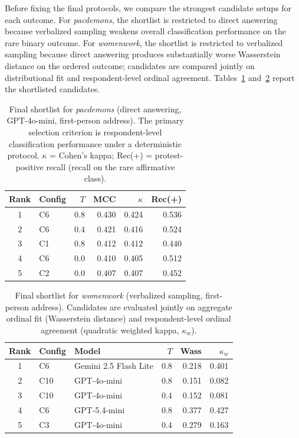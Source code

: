 Before fixing the final protocols, we compare the strongest candidate
setups for each outcome. For \textit{pacdemons}, the shortlist is
restricted to direct answering because verbalized sampling weakens overall
classification performance on the rare binary outcome. For
\textit{womenwork}, the shortlist is restricted to verbalized sampling
because direct answering produces substantially worse Wasserstein distance
on the ordered outcome; candidates are compared jointly on distributional
fit and respondent-level ordinal agreement.
Tables~\ref{tab:final-shortlist-pacdemons}
and~\ref{tab:final-shortlist-womenwork} report the shortlisted candidates.

\begin{table}[H]
\centering
\caption{Final shortlist for \textit{pacdemons} (direct answering,
GPT-4o-mini, first-person address). The primary selection criterion is
respondent-level classification performance under a deterministic protocol.
$\kappa$ = Cohen's kappa; Rec(+) = protest-positive recall (recall on the
rare affirmative class).}
\label{tab:final-shortlist-pacdemons}
\small
\begin{tabular}{@{}clr|rrr@{}}
\toprule
Rank & Config & $T$ & MCC & $\kappa$ & Rec(+) \\
\midrule
1 & C6 & 0.8 & 0.430 & 0.424 & 0.536 \\
2 & C6 & 0.4 & 0.421 & 0.416 & 0.524 \\
3 & C1 & 0.8 & 0.412 & 0.412 & 0.440 \\
4 & C6 & 0.0 & 0.410 & 0.405 & 0.512 \\
5 & C2 & 0.0 & 0.407 & 0.407 & 0.452 \\
\bottomrule
\end{tabular}
\end{table}

\begin{table}[H]
\centering
\caption{Final shortlist for \textit{womenwork} (verbalized sampling,
first-person address). Candidates are evaluated jointly on aggregate
ordinal fit (Wasserstein distance) and respondent-level ordinal agreement
(quadratic weighted kappa, $\kappa_w$).}
\label{tab:final-shortlist-womenwork}
\small
\begin{tabular}{@{}cllr|rr@{}}
\toprule
Rank & Config & Model & $T$ & Wass & $\kappa_w$ \\
\midrule
1 & C6 & Gemini 2.5 Flash Lite & 0.8 & 0.218 & 0.401 \\
2 & C10 & GPT-4o-mini           & 0.8 & 0.151 & 0.082 \\
3 & C10 & GPT-4o-mini           & 0.4 & 0.152 & 0.081 \\
4 & C6 & GPT-5.4-mini          & 0.8 & 0.377 & 0.427 \\
5 & C3 & GPT-4o-mini           & 0.4 & 0.279 & 0.163 \\
\bottomrule
\end{tabular}
\end{table}

